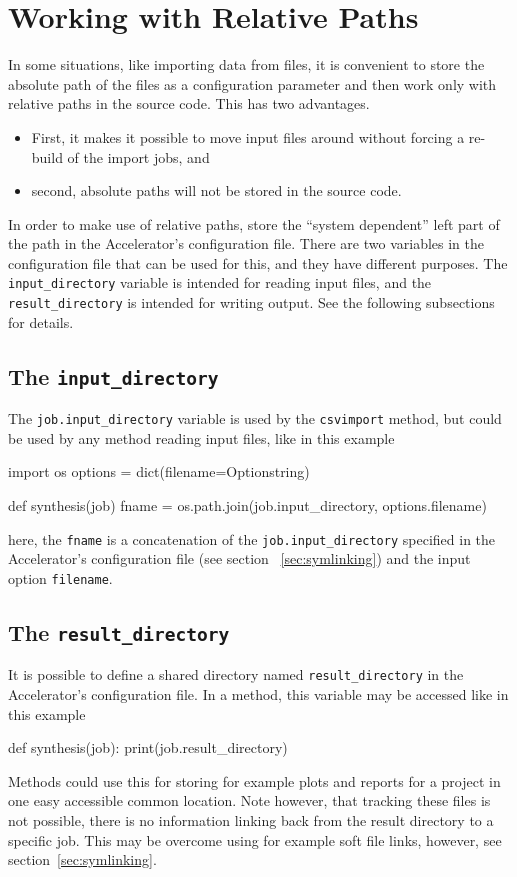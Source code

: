 \section{Working with Relative Paths}
In some situations, like importing data from files, it is convenient
to store the absolute path of the files as a configuration parameter
and then work only with relative paths in the source code.  This has
two advantages.
\begin{itemize}
\item[] First, it makes it possible to move input files around without
forcing a re-build of the import jobs, and
\item[] second, absolute paths will not be stored in the source code.
\end{itemize}
In order to make use of relative paths, store the ``system dependent''
left part of the path in the Accelerator's configuration file.  There
are two variables in the configuration file that can be used for this,
and they have different purposes.  The \texttt{input\_directory}
variable is intended for reading input files, and
the \texttt{result\_directory} is intended for writing output.  See
the following subsections for details.


\subsection{The \texttt{input\_directory}}
\label{sec:INPUT_DIR}
The \texttt{job.input\_directory} variable is used by the
\texttt{csvimport} method, but could be used by any method reading
input files, like in this example
\begin{python}
import os
options = dict(filename=Optionstring)

def synthesis(job)
    fname = os.path.join(job.input_directory, options.filename)
\end{python}
here, the \texttt{fname} is a concatenation of the
\texttt{job.input\_directory} specified in the Accelerator's
configuration file (see section ~\ref{sec:symlinking}) and the input
option \texttt{filename}.


\subsection{The \texttt{result\_directory}}
\label{sec:RESULT_DIR}
It is possible to define a shared directory
named \texttt{result\_directory} in the Accelerator's configuration
file.  In a method, this variable may be accessed like in this example
\begin{python}
def synthesis(job):
    print(job.result_directory)
\end{python}
Methods could use this for storing for example plots and reports for a
project in one easy accessible common location.  Note however, that
tracking these files is not possible, there is no information linking
back from the result directory to a specific job.  This may be
overcome using for example soft file links, however, see
section~\ref{sec:symlinking}.




